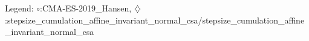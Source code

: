 Legend: {\color{CornflowerBlue}$\circ$}:CMA-ES-2019\_Hansen, {\color{Orange}$\diamondsuit$}:stepsize\_cumulation\_affine\_invariant\_normal\_csa/stepsize\_cumulation\_affine\_invariant\_normal\_csa